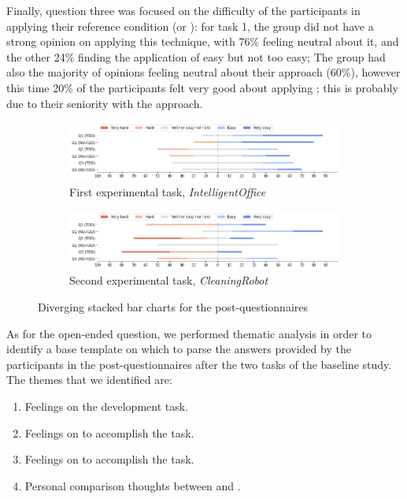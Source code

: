 Finally, question three was focused on the difficulty of the participants in applying their reference condition (\ie \tdd or \notdd): for task 1, the \tdd group did not have a strong opinion on applying this technique, with 76\% feeling neutral about it, and the other 24\% finding the application of \tdd easy but not too easy; The \notdd group had also the majority of opinions feeling neutral about their approach (60\%), however this time 20\% of the participants felt very good about applying \notdd; this is probably due to their seniority with the approach.


\begin{figure}[htbp]
    \begin{subfigure}{\textwidth}
        \includegraphics[width=\textwidth]{figures/bar_charts/task1.png}
        \caption{First experimental task, \textit{IntelligentOffice}}
    \end{subfigure}
    
    \bigskip
    
    \begin{subfigure}{\textwidth}
        \includegraphics[width=\textwidth]{figures/bar_charts/task2.png}
        \caption{Second experimental task, \textit{CleaningRobot}}
    \end{subfigure}
    
    \caption{Diverging stacked bar charts for the post-questionnaires}
    \label{bar_charts}
\end{figure}

As for the open-ended question, we performed thematic analysis in order to identify a base template on which to parse the answers provided by the participants in the post-questionnaires after the two tasks of the baseline study.
The themes that we identified are:
\begin{enumerate}
    \item Feelings on the development task.
    \item Feelings on \tdd to accomplish the task.
    \item Feelings on \notdd to accomplish the task.
    \item Personal comparison thoughts between \tdd and \notdd.
\end{enumerate}


